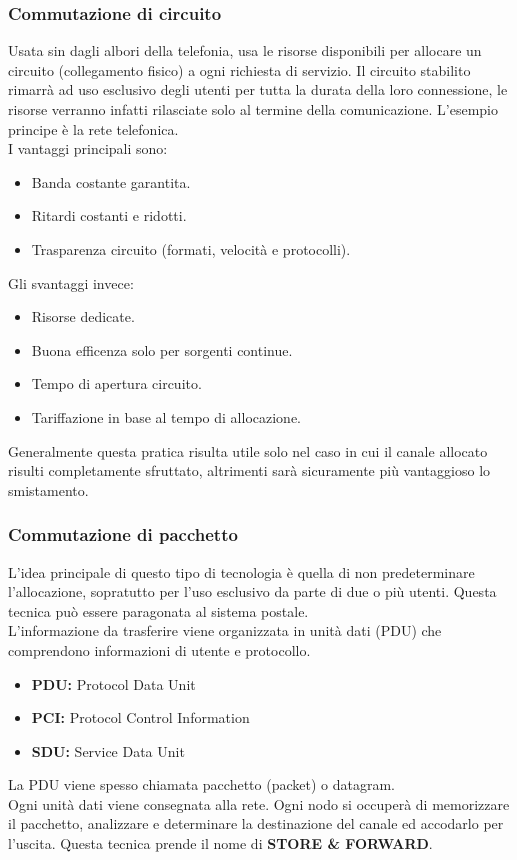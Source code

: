 \documentclass[12pt]{article}
\begin{document}
\subsubsection{Commutazione di circuito}
Usata sin dagli albori della telefonia, usa le risorse disponibili per allocare un circuito (collegamento fisico) a ogni richiesta di servizio. Il circuito stabilito rimarrà ad uso esclusivo degli utenti per tutta la durata della loro connessione, le risorse verranno infatti rilasciate solo al termine della comunicazione. L'esempio principe è la rete telefonica.\\
I vantaggi principali sono:
\begin{itemize}
  \item Banda costante garantita.
  \item Ritardi costanti e ridotti.
  \item Trasparenza circuito (formati, velocità e protocolli).
\end{itemize}
Gli svantaggi invece:
\begin{itemize}
  \item Risorse dedicate.
  \item Buona efficenza solo per sorgenti continue.
  \item Tempo di apertura circuito.
  \item Tariffazione in base al tempo di allocazione.
\end{itemize}
Generalmente questa pratica risulta utile solo nel caso in cui il canale allocato risulti completamente sfruttato, altrimenti sarà sicuramente più vantaggioso lo smistamento.
\subsubsection{Commutazione di pacchetto}
L'idea principale di questo tipo di tecnologia è quella di non predeterminare l'allocazione, sopratutto per l'uso esclusivo da parte di due o più utenti. Questa tecnica può essere paragonata al sistema postale.\\
L'informazione da trasferire viene organizzata in unità dati (PDU) che comprendono informazioni di utente e protocollo.
\begin{itemize}
  \item \textbf{PDU:} Protocol Data Unit
  \item \textbf{PCI:} Protocol Control Information
  \item \textbf{SDU:} Service Data Unit
\end{itemize}
La PDU viene spesso chiamata pacchetto (packet) o datagram.\\
Ogni unità dati viene consegnata alla rete. Ogni nodo si occuperà di memorizzare il pacchetto, analizzare e determinare la destinazione del canale ed accodarlo per l'uscita. Questa tecnica prende il nome di \textbf{STORE \& FORWARD}.
\end{document}
